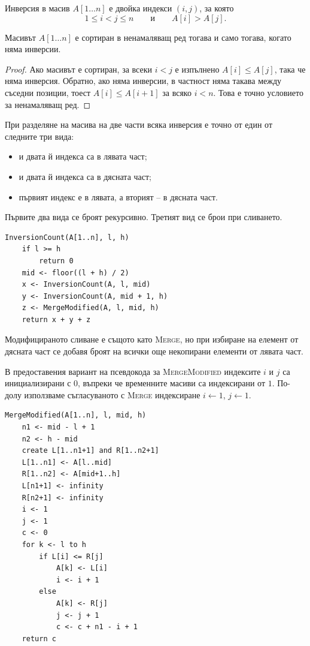 \begin{defn}
Инверсия в масив $A[1\ldots n]$ е двойка индекси $(i,j)$, за която
\[
1\leq i<j\leq n
\qquad\text{и}\qquad
A[i]>A[j].
\]
\end{defn}

\begin{prop}
Масивът $A[1\ldots n]$ е сортиран в ненамаляващ ред тогава и само тогава, когато няма инверсии.
\end{prop}

\begin{proof}
Ако масивът е сортиран, за всеки $i<j$ е изпълнено $A[i]\le A[j]$, така че няма инверсия. Обратно, ако няма инверсии, в частност няма такава между съседни позиции, тоест $A[i]\le A[i+1]$ за всяко $i<n$. Това е точно условието за ненамаляващ ред.
\end{proof}

При разделяне на масива на две части всяка инверсия е точно от един от следните три вида:
\begin{itemize}
    \item и двата й индекса са в лявата част;
    \item и двата й индекса са в дясната част;
    \item първият индекс е в лявата, а вторият -- в дясната част.
\end{itemize}
Първите два вида се броят рекурсивно. Третият вид се брои при сливането.

\begin{verbatim}
InversionCount(A[1..n], l, h)
    if l >= h
        return 0
    mid <- floor((l + h) / 2)
    x <- InversionCount(A, l, mid)
    y <- InversionCount(A, mid + 1, h)
    z <- MergeModified(A, l, mid, h)
    return x + y + z
\end{verbatim}

Модифицираното сливане е същото като \textsc{Merge}, но при избиране на елемент от дясната част се добавя броят на всички още некопирани елементи от лявата част.

\begin{supp}[Бележка]
В предоставения вариант на псевдокода за \textsc{MergeModified} индексите $i$ и $j$ са инициализирани с $0$, въпреки че временните масиви са индексирани от $1$. По-долу използваме съгласуваното с \textsc{Merge} индексиране $i\leftarrow 1$, $j\leftarrow 1$.
\end{supp}

\begin{verbatim}
MergeModified(A[1..n], l, mid, h)
    n1 <- mid - l + 1
    n2 <- h - mid
    create L[1..n1+1] and R[1..n2+1]
    L[1..n1] <- A[l..mid]
    R[1..n2] <- A[mid+1..h]
    L[n1+1] <- infinity
    R[n2+1] <- infinity
    i <- 1
    j <- 1
    c <- 0
    for k <- l to h
        if L[i] <= R[j]
            A[k] <- L[i]
            i <- i + 1
        else
            A[k] <- R[j]
            j <- j + 1
            c <- c + n1 - i + 1
    return c
\end{verbatim}

